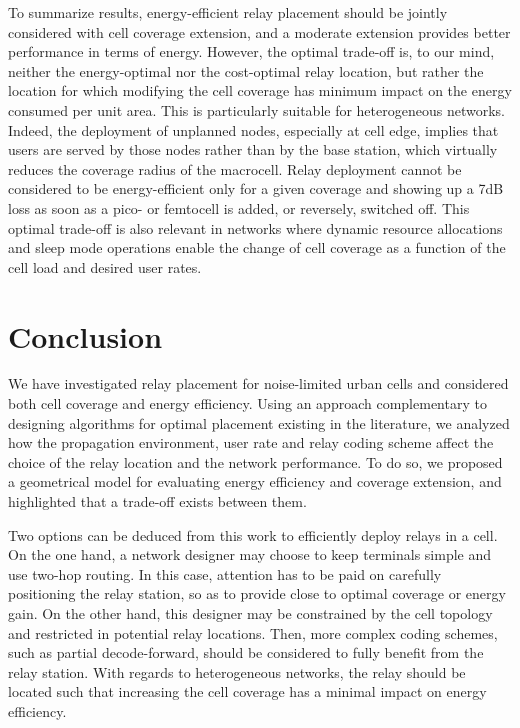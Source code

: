 \documentclass[journal]{IEEEtran}
\theoremstyle{definition}
\begin{document}
To summarize results, energy-efficient relay placement should be jointly considered with cell coverage extension, and a moderate extension provides better performance in terms of energy. However, the optimal trade-off is, to our mind, 
neither the energy-optimal nor the cost-optimal relay location, but rather the location for which modifying the cell coverage has minimum impact on the energy consumed per unit area. This is particularly suitable for heterogeneous networks. 
Indeed, the deployment of unplanned nodes, especially at cell edge, implies that users are served by those
nodes rather than by the base station, which virtually reduces the coverage radius of the macrocell.
Relay deployment cannot be considered to be energy-efficient only for a given coverage and showing up a 7dB loss as soon as a pico- or femtocell is added, or reversely, switched off.
This optimal trade-off is also relevant in networks where dynamic resource allocations and sleep mode operations enable the change of cell coverage as a function of the cell load and desired user rates.



\section{Conclusion}
\label{sec:conclusion}
We have investigated relay placement for noise-limited urban cells and considered both cell coverage and energy efficiency.
Using an approach complementary to designing algorithms for optimal placement existing in the literature, we analyzed how the propagation environment, user rate and relay coding scheme affect the choice of the relay location and the network performance. 
To do so, we proposed a geometrical model for evaluating energy efficiency and coverage extension, and highlighted that a trade-off exists between them.

Two options can be deduced from this work to efficiently deploy relays in a cell. On the one hand, a network designer may choose to keep terminals simple and use two-hop routing. In this case, attention has to be paid on carefully positioning the relay station, so as to provide close to optimal coverage or energy gain. On the other hand, this designer may be constrained by the cell topology and restricted in potential relay locations. Then, more complex coding schemes, such as partial decode-forward, should be considered to fully benefit from the relay station.
With regards to heterogeneous networks, 
the relay should be located such that increasing the cell coverage has a minimal impact on energy efficiency.
\end{document}
